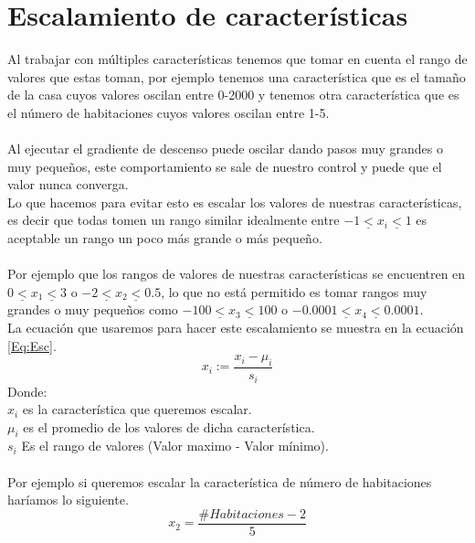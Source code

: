 \documentclass{report}
\begin{document}
\section{Escalamiento de características}
Al trabajar con múltiples características tenemos que tomar en cuenta el rango de valores que estas toman, por ejemplo tenemos una característica que es el tamaño de la casa cuyos valores oscilan entre 0-2000 y tenemos otra característica que es el número de habitaciones cuyos valores oscilan entre 1-5.\\\\Al ejecutar el gradiente de descenso puede oscilar dando pasos muy grandes o muy pequeños, este comportamiento se sale de nuestro control y puede que el valor nunca converga.\\Lo que hacemos para evitar esto es escalar los valores de nuestras características, es decir que todas tomen un rango similar idealmente entre $-1\underline{<} x_i \underline{<}1$ es aceptable un rango un poco más grande o más pequeño. \\\\Por ejemplo que los rangos de valores de nuestras características se encuentren en $0\underline{<}x_1\underline{<}3$ o $-2\underline{<}x_2\underline{<}0.5$, lo que no está permitido es tomar rangos muy grandes o muy pequeños como $-100\underline{<}x_3\underline{<}100$ o $-0.0001\underline{<}x_4\underline{<}0.0001$.\\La ecuación que usaremos para hacer este escalamiento se muestra en la ecuación \ref{Eq:Esc}.
\begin{equation}
	x_i:=\frac{x_i-\mu_i}{s_i}
	\label{Eq:Esc}
\end{equation}
Donde:\\$x_i$ es la característica que queremos escalar.\\$\mu_i$ es el promedio de los valores de dicha característica.\\
$s_i$ Es el rango de valores (Valor maximo - Valor mínimo).\\\\Por ejemplo si queremos escalar la característica de número de habitaciones haríamos lo siguiente.
\[
x_2=\frac{\#Habitaciones-2}{5}
\]
\end{document}
